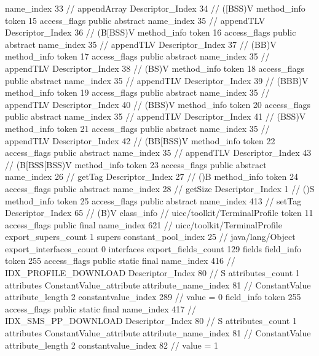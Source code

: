 {{{{{					name_index	33		// appendArray
					Descriptor_Index	34		// ([BSS)V
				}
				method_info {
					token	15
					access_flags	public abstract
					name_index	35		// appendTLV
					Descriptor_Index	36		// (B[BSS)V
				}
				method_info {
					token	16
					access_flags	public abstract
					name_index	35		// appendTLV
					Descriptor_Index	37		// (BB)V
				}
				method_info {
					token	17
					access_flags	public abstract
					name_index	35		// appendTLV
					Descriptor_Index	38		// (BS)V
				}
				method_info {
					token	18
					access_flags	public abstract
					name_index	35		// appendTLV
					Descriptor_Index	39		// (BBB)V
				}
				method_info {
					token	19
					access_flags	public abstract
					name_index	35		// appendTLV
					Descriptor_Index	40		// (BBS)V
				}
				method_info {
					token	20
					access_flags	public abstract
					name_index	35		// appendTLV
					Descriptor_Index	41		// (BSS)V
				}
				method_info {
					token	21
					access_flags	public abstract
					name_index	35		// appendTLV
					Descriptor_Index	42		// (BB[BSS)V
				}
				method_info {
					token	22
					access_flags	public abstract
					name_index	35		// appendTLV
					Descriptor_Index	43		// (B[BSS[BSS)V
				}
				method_info {
					token	23
					access_flags	public abstract
					name_index	26		// getTag
					Descriptor_Index	27		// ()B
				}
				method_info {
					token	24
					access_flags	public abstract
					name_index	28		// getSize
					Descriptor_Index	1		// ()S
				}
				method_info {
					token	25
					access_flags	public abstract
					name_index	413		// setTag
					Descriptor_Index	65		// (B)V
				}
			}
		}
		class_info {		// uicc/toolkit/TerminalProfile
			token	11
			access_flags	public final
			name_index	621		// uicc/toolkit/TerminalProfile
			export_supers_count	1
			supers {
				constant_pool_index	25		// java/lang/Object
			}
			export_interfaces_count	0
			interfaces {
			}
			export_fields_count	129
			fields {
			field_info {
				token	255
				access_flags	public static final
				name_index	416		// IDX_PROFILE_DOWNLOAD
				Descriptor_Index	80		// S
				attributes_count	1
				attributes {
				ConstantValue_attribute {
					attribute_name_index	81		// ConstantValue
					attribute_length	2
					constantvalue_index	289		// value = 0
				}
				}
			}
			field_info {
				token	255
				access_flags	public static final
				name_index	417		// IDX_SMS_PP_DOWNLOAD
				Descriptor_Index	80		// S
				attributes_count	1
				attributes {
				ConstantValue_attribute {
					attribute_name_index	81		// ConstantValue
					attribute_length	2
					constantvalue_index	82		// value = 1
}}}}}}}
